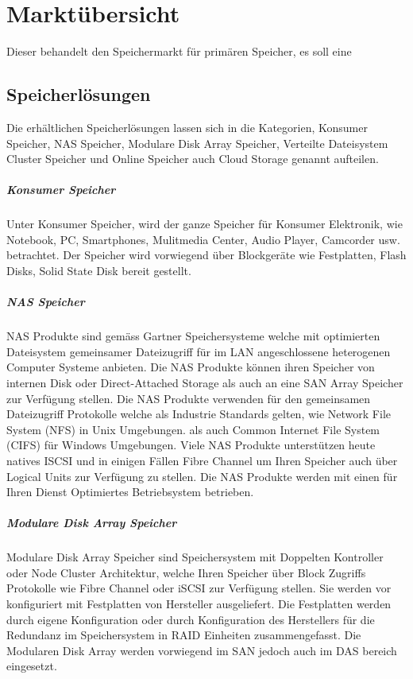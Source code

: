 \cleardoublepage
\chapter{Marktübersicht}

Dieser behandelt den Speichermarkt für primären Speicher, es soll eine 

\section{Speicherlösungen}
Die erhältlichen Speicherlösungen lassen sich in die Kategorien, Konsumer Speicher, NAS Speicher, Modulare Disk Array Speicher, Verteilte Dateisystem Cluster Speicher und Online Speicher auch Cloud Storage genannt aufteilen.

\paragraph*{Konsumer Speicher}
Unter Konsumer Speicher, wird der ganze Speicher für Konsumer Elektronik, wie Notebook, PC, Smartphones, Mulitmedia Center, Audio Player, Camcorder usw. betrachtet. Der Speicher wird vorwiegend über Blockgeräte wie Festplatten, Flash Disks, Solid State Disk bereit gestellt.

\paragraph*{NAS Speicher}
NAS Produkte sind gemäss Gartner Speichersysteme welche mit optimierten Dateisystem gemeinsamer Dateizugriff für im LAN angeschlossene heterogenen Computer Systeme anbieten. Die NAS Produkte können ihren Speicher von internen Disk oder Direct-Attached Storage als auch an eine SAN Array Speicher zur Verfügung stellen. Die NAS Produkte verwenden für den gemeinsamen Dateizugriff Protokolle welche als Industrie Standards gelten, wie Network File System (NFS) in Unix Umgebungen. als auch Common Internet File System (CIFS) für Windows Umgebungen. 
Viele NAS Produkte unterstützen heute natives ISCSI und in einigen Fällen Fibre Channel um Ihren Speicher auch über Logical Units zur Verfügung zu stellen. Die NAS Produkte werden mit einen für Ihren Dienst Optimiertes Betriebsystem betrieben.\cite{RogerW.CoxPushanRinnenStanleyZaffos2011}

\paragraph*{Modulare Disk Array Speicher}
Modulare Disk Array Speicher sind Speichersystem mit Doppelten Kontroller oder Node Cluster Architektur, welche Ihren Speicher über Block Zugriffs Protokolle wie Fibre Channel oder iSCSI zur Verfügung stellen. Sie werden vor konfiguriert mit Festplatten von Hersteller ausgeliefert. Die Festplatten werden durch eigene Konfiguration oder durch Konfiguration des Herstellers für die Redundanz im Speichersystem in RAID Einheiten zusammengefasst. Die Modularen Disk Array werden vorwiegend im SAN jedoch auch im DAS bereich eingesetzt.

